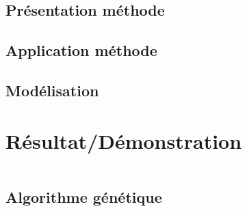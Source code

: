 \documentclass{beamer}
\begin{document}
        \subsection{Présentation méthode}
	        
	    \subsection{Application méthode}
        	
        \subsection{Modélisation}
        	
        	
    \section{Résultat/Démonstration}
        \begin{frame}
            \begin{columns}[t]
  				\begin{column}{5cm}
  					\tableofcontents[sections={1-4}, currentsection]
  				\end{column}
  				\begin{column}{5cm}
  					\tableofcontents[sections={5-8}, currentsection]
  				\end{column}
  			\end{columns}
        \end{frame}
       \subsection{Algorithme génétique}
            \begin{frame}
                \begin{columns}[t]
                    \begin{column}{5cm}
                        \tableofcontents[sections={1-4}, currentsubsection]
                    \end{column}
                    \begin{column}{5cm}
                        \tableofcontents[sections={5-8}, currentsubsection]
                    \end{column}
                \end{columns}
            \end{frame}
        	
\end{document}
